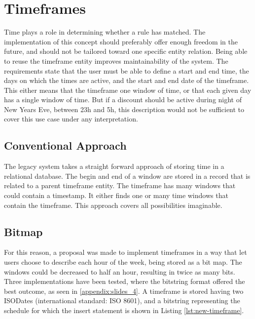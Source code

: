 %
\section{Timeframes}
Time plays a role in determining whether a rule has matched. The implementation of this concept should preferably offer enough freedom in the future, and should not be tailored toward one specific entity relation. Being able to reuse the timeframe entity improves maintainability of the system. The requirements state that the user must be able to define a start and end time, the days on which the times are active, and the start and end date of the timeframe. This either means that the timeframe one window of time, or that each given day has a single window of time. But if a discount should be active during night of New Years Eve, between 23h and 5h, this description would not be sufficient to cover this use case under any interpretation.

\subsection{Conventional Approach}
The legacy system takes a straight forward approach of storing time in a relational database. The begin and end of a window are stored in a record that is related to a parent timeframe entity. The timeframe has many windows that could contain a timestamp. It either finds one or many time windows that contain the timeframe. This approach covers all possibilities imaginable.

\subsection{Bitmap}
For this reason, a proposal was made to implement timeframes in a way that let users choose to describe each hour of the week, being stored as a bit map. The windows could be decreased to half an hour, resulting in twice as many bits. Three implementations have been tested, where the bitstring format offered the best outcome, as seen in \ref{appendix:slides_4}. A timeframe is stored having two ISODates (international standard: ISO 8601), and a bitstring representing the schedule for which the insert statement is shown in Listing \ref{lst:new-timeframe}.

